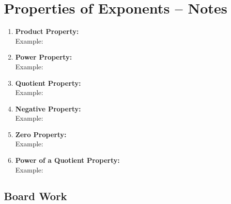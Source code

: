 \documentclass[12pt]{article}
\begin{document}
\pagebreak

\section{Properties of Exponents -- Notes}


\begin{enumerate}
\setlength\itemsep{1cm}

	\item \textbf{Product Property:} \\
	
		\hspace{.6in} Example: \\ 
	
	\item \textbf{Power Property:} \\
	
		\hspace{.6in} Example: \\ 
	
	\item \textbf{Quotient Property:} \\
	
		\hspace{.6in} Example: \\ 
	
	\item \textbf{Negative Property:} \\
	
		\hspace{.6in} Example:\\ 
	
	\item \textbf{Zero Property:} \\
		
		\hspace{.6in} Example:\\ 
	
	\item \textbf{Power of a Quotient Property:}\\
	
		\hspace{.6in} Example: \\

\end{enumerate}

\pagebreak

\subsection{Board Work}
\end{document}
